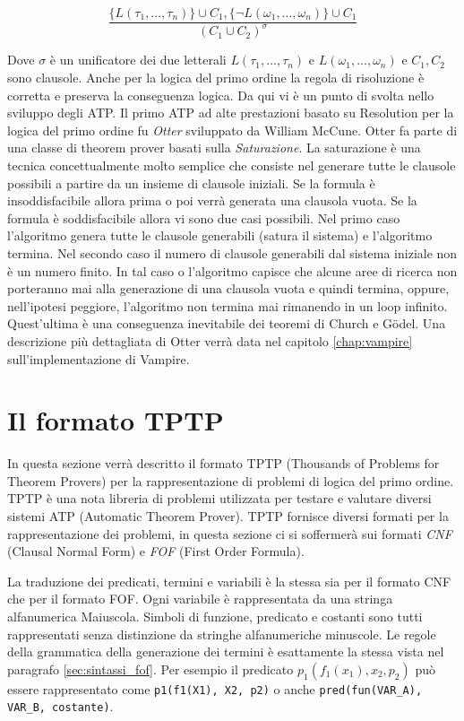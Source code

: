\documentclass[./main.tex]{subfiles}
\begin{document}
$$ \frac{\{L(\tau_1, ..., \tau_n)\} \cup C_1, \{\lnot L(\omega_1, ..., \omega_n)\} \cup C_1}{(C_1 \cup C_2)^\sigma} $$

Dove $\sigma$ è un unificatore dei due letterali $L(\tau_1, ..., \tau_n)$ e $L(\omega_1, ..., \omega_n)$ e $C_1, C_2$ sono clausole.
Anche per la logica del primo ordine la regola di risoluzione è corretta e preserva la conseguenza logica.
Da qui vi è un punto di svolta nello sviluppo degli ATP.
Il primo ATP ad alte prestazioni basato su Resolution per la logica del primo ordine fu \textit{Otter} sviluppato da William McCune.
Otter fa parte di una classe di theorem prover basati sulla \textit{Saturazione}.
La saturazione è una tecnica concettualmente molto semplice che consiste nel generare 
tutte le clausole possibili a partire da un insieme di clausole iniziali.
Se la formula è insoddisfacibile allora prima o poi verrà generata una clausola vuota.
Se la formula è soddisfacibile allora vi sono due casi possibili.
Nel primo caso l'algoritmo genera tutte le clausole generabili (satura il sistema) e l'algoritmo termina.
Nel secondo caso il numero di clausole generabili dal sistema iniziale non è un numero finito.
In tal caso o l'algoritmo capisce che alcune aree di ricerca non porteranno mai alla generazione 
di una clausola vuota e quindi termina,
oppure, nell'ipotesi peggiore, l'algoritmo non termina mai rimanendo in un loop infinito.
Quest'ultima è una conseguenza inevitabile dei teoremi di Church e Gödel.
Una descrizione più dettagliata di Otter verrà data nel capitolo \ref{chap:vampire} sull'implementazione di Vampire.




\section{Il formato TPTP} \label{sec:tptp_lang}
In questa sezione verrà descritto il formato TPTP \cite{tptpLan} (Thousands of Problems for Theorem Provers) 
per la rappresentazione di problemi di logica del primo ordine.
TPTP è una nota libreria di problemi utilizzata per testare e valutare diversi sistemi ATP (Automatic Theorem Prover).
TPTP fornisce diversi formati per la rappresentazione dei problemi,
in questa sezione ci si soffermerà sui formati \textit{CNF} (Clausal Normal Form) e \textit{FOF} (First Order Formula).


La traduzione dei predicati, termini e variabili è la stessa sia per il formato CNF che per il formato FOF.
Ogni variabile è rappresentata da una stringa alfanumerica Maiuscola. 
Simboli di funzione, predicato e costanti sono tutti rappresentati senza distinzione da stringhe alfanumeriche minuscole.
Le regole della grammatica della generazione dei termini è esattamente la stessa vista nel paragrafo \ref{sec:sintassi_fof}.
Per esempio il predicato $p_1(f_1(x_1), x_2, p_2)$ 
può essere rappresentato come \texttt{p1(f1(X1), X2, p2)} o anche \texttt{pred(fun(VAR\_A), VAR\_B, costante)}.
\end{document}
